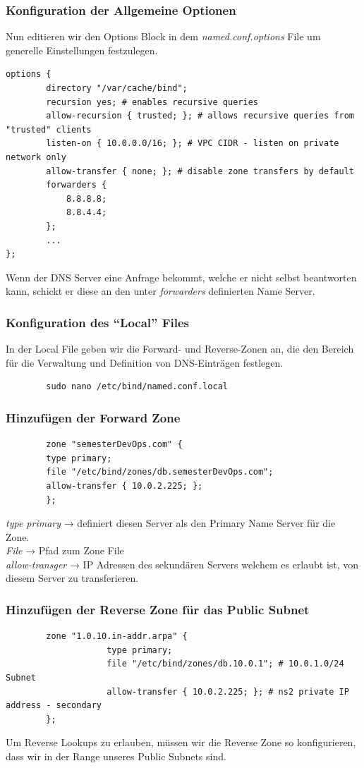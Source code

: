 \documentclass[a4paper,12pt]{article}
\begin{document}
\subsubsection{Konfiguration der Allgemeine Optionen}
Nun editieren wir den Options Block in dem \textit{named.conf.options} File um generelle Einstellungen festzulegen.
\begin{verbatim}
options {
		directory "/var/cache/bind";
		recursion yes; # enables recursive queries
		allow-recursion { trusted; }; # allows recursive queries from "trusted" clients
		listen-on { 10.0.0.0/16; }; # VPC CIDR - listen on private network only
		allow-transfer { none; }; # disable zone transfers by default
		forwarders {
			8.8.8.8;
			8.8.4.4;
		};
		...
};
\end{verbatim}
Wenn der DNS Server eine Anfrage bekommt, welche er nicht selbst beantworten kann, schickt er diese an den unter \textit{forwarders} definierten Name Server.


\subsubsection{Konfiguration des “Local” Files}
In der Local File geben wir die Forward- und Reverse-Zonen an, die den Bereich für die Verwaltung und Definition von DNS-Einträgen festlegen.
\begin{verbatim}
		sudo nano /etc/bind/named.conf.local
\end{verbatim}

\subsubsection{Hinzufügen der Forward Zone}
\begin{verbatim}
		zone "semesterDevOps.com" {
		type primary;
		file "/etc/bind/zones/db.semesterDevOps.com"; 
		allow-transfer { 10.0.2.225; };
		};
\end{verbatim}
\textit{type primary} → definiert diesen Server als den Primary Name Server für die Zone. \\
\textit{File} → Pfad zum Zone File \\
\textit{allow-transger} → IP Adressen des sekundären Servers welchem es erlaubt ist, von diesem Server zu transferieren. \\


\subsubsection{Hinzufügen der Reverse Zone für das Public Subnet}
\begin{verbatim}
		zone "1.0.10.in-addr.arpa" {
					type primary;
					file "/etc/bind/zones/db.10.0.1"; # 10.0.1.0/24 Subnet
					allow-transfer { 10.0.2.225; }; # ns2 private IP address - secondary
		};
\end{verbatim}
Um Reverse Lookups zu erlauben, müssen wir die Reverse Zone so konfigurieren, dass wir in der Range unseres Public Subnets sind.
\end{document}
